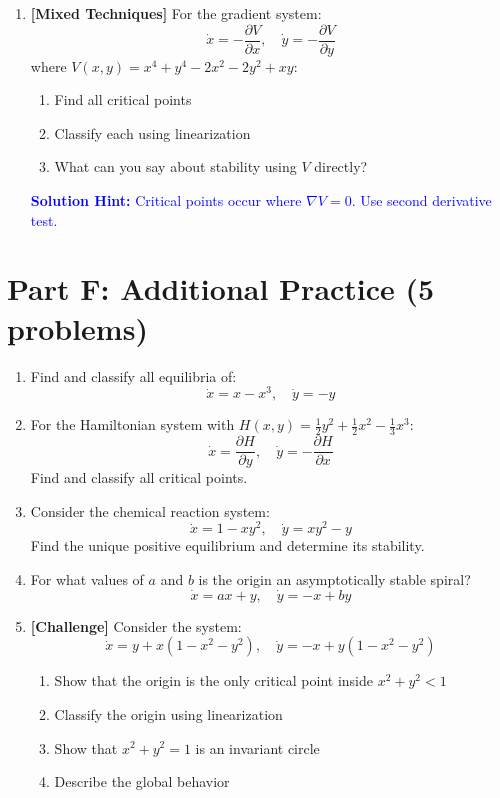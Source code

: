\documentclass[12pt]{article}
\newcommand{\solution}[1]{\textcolor{blue}{\textbf{Solution Hint:} #1}}
\begin{document}
\begin{enumerate}[resume]
\item \textbf{[Mixed Techniques]} For the gradient system:
$$\dot{x} = -\frac{\partial V}{\partial x}, \quad \dot{y} = -\frac{\partial V}{\partial y}$$
where $V(x,y) = x^4 + y^4 - 2x^2 - 2y^2 + xy$:
\begin{enumerate}[label=(\alph*)]
    \item Find all critical points
    \item Classify each using linearization
    \item What can you say about stability using $V$ directly?
\end{enumerate}
\solution{Critical points occur where $\nabla V = 0$. Use second derivative test.}
\end{enumerate}

\section*{Part F: Additional Practice (5 problems)}

\begin{enumerate}[resume]
\item Find and classify all equilibria of:
$$\dot{x} = x - x^3, \quad \dot{y} = -y$$

\item For the Hamiltonian system with $H(x,y) = \frac{1}{2}y^2 + \frac{1}{2}x^2 - \frac{1}{3}x^3$:
$$\dot{x} = \frac{\partial H}{\partial y}, \quad \dot{y} = -\frac{\partial H}{\partial x}$$
Find and classify all critical points.

\item Consider the chemical reaction system:
$$\dot{x} = 1 - xy^2, \quad \dot{y} = xy^2 - y$$
Find the unique positive equilibrium and determine its stability.

\item For what values of $a$ and $b$ is the origin an asymptotically stable spiral?
$$\dot{x} = ax + y, \quad \dot{y} = -x + by$$

\item \textbf{[Challenge]} Consider the system:
$$\dot{x} = y + x(1 - x^2 - y^2), \quad \dot{y} = -x + y(1 - x^2 - y^2)$$
\begin{enumerate}[label=(\alph*)]
    \item Show that the origin is the only critical point inside $x^2 + y^2 < 1$
    \item Classify the origin using linearization
    \item Show that $x^2 + y^2 = 1$ is an invariant circle
    \item Describe the global behavior
\end{enumerate}
\end{enumerate}
\end{document}
